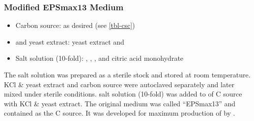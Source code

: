 \subsubsection{Modified EPSmax13 Medium}%
\begin{itemize}
	\item Carbon source: as desired (see \vref{tbl-csc})
	\item {} and yeast extract:
		 yeast extract and
		 
	\item Salt solution (10-fold):
		 ,
		 ,
		 ,
		  and
		 citric acid monohydrate
\end{itemize}
The salt solution was prepared as a sterile stock and stored at room temperature. KCl \& yeast extract and carbon source were autoclaved separately and later mixed under sterile conditions.  salt solution (10-fold) was added to  of C source with KCl \& yeast extract. The original medium was called \enquote{EPSmax13} and contained  \glc{} as the C source. It was developed for maximum production of \scl{} by \rolf{} \cite{Schmid2008}.

